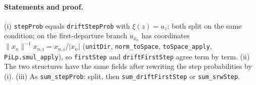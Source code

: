 \paragraph{Statements and proof.} (i) \texttt{stepProb} equals \texttt{driftStepProb} with
$\xi(z)=u_z$: both split on the same condition; on the first-departure branch
$u_{x_n}$ has coordinates $\|x_n\|^{-1}x_{n,i}=x_{n,i}/|x_n|$ (\texttt{unitDir}, \texttt{norm\_toSpace},
\texttt{toSpace\_apply}, \texttt{PiLp.smul\_apply}), so \texttt{firstStep} and \texttt{driftFirstStep}
agree term by term. (ii) The two structures have the same fields after rewriting the step
probabilities by (i). (iii) As \texttt{sum\_stepProb}: split, then \texttt{sum\_driftFirstStep} or
\texttt{sum\_srwStep}.

